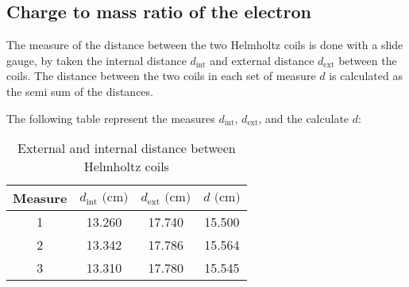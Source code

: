 \subsection{Charge to mass ratio of the electron}
The measure of the distance between the two Helmholtz coils is done with a slide gauge, by taken 
the internal distance $d_{\text{int}}$ and external distance $d_{\text{ext}}$ between the coils.
The distance between the two coils in each set of measure $d$ is calculated as the semi sum of the distances. 

The following table represent the measures $d_{\text{int}}$, $d_{\text{ext}}$, and the calculate $d$:
\begin{table}[!htbp]
    {\par\centering
    \begin{tabular}{cccc}
        \hline
        Measure & $d_{\text{int}} \text{ (cm)}$ & $d_{\text{ext}} \text{ (cm)}$ & $d \text{ (cm)}$\\
        \hline
        1   &   13.260& 17.740&   15.500\\
        2   &   13.342& 17.786&   15.564\\
        3   &   13.310& 17.780&   15.545\\
        \hline
    \end{tabular}
    \par}
    \caption{External and internal distance between Helmholtz coils}
\end{table}

